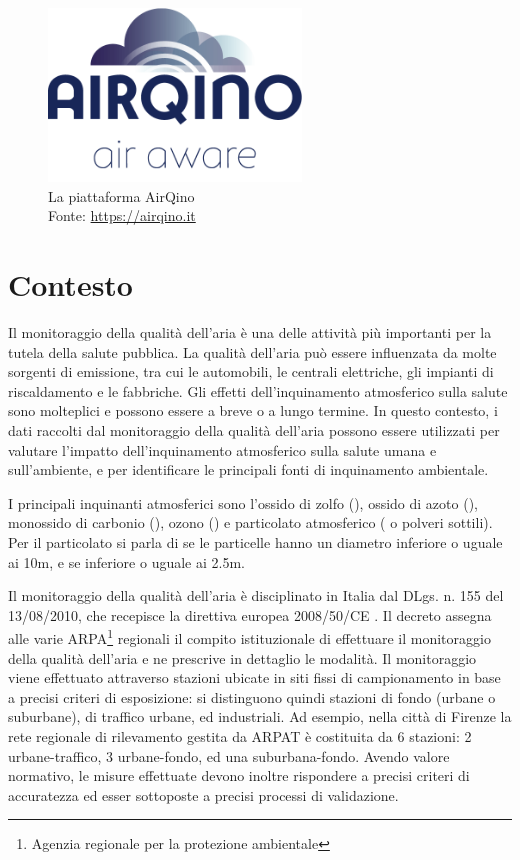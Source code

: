 \vspace{3mm}
\begin{figure}[H]
\centering
\captionsetup{justification=centering}
\includegraphics[width=0.60\textwidth,height=\textheight,keepaspectratio]{img/airqino}
\caption{La piattaforma AirQino\\Fonte: \url{https://airqino.it}}
\label{fig:airqino}
\end{figure}

\section{Contesto}\label{sec:contesto}
Il monitoraggio della qualità dell'aria è una delle attività più importanti per la tutela della salute pubblica. La qualità dell'aria può essere influenzata da molte sorgenti di emissione, tra cui le automobili, le centrali elettriche, gli impianti di riscaldamento e le fabbriche. Gli effetti dell'inquinamento atmosferico sulla salute sono molteplici e possono essere a breve o a lungo termine. In questo contesto, i dati raccolti dal monitoraggio della qualità dell'aria possono essere utilizzati per valutare l'impatto dell'inquinamento atmosferico sulla salute umana e sull'ambiente, e per identificare le principali fonti di inquinamento ambientale.

I principali inquinanti atmosferici sono l'ossido di zolfo (), ossido di azoto (), monossido di carbonio (), ozono () e particolato atmosferico ( o polveri sottili). Per il particolato si parla di  se le particelle hanno un diametro inferiore o uguale ai 10\textmu m, e  se inferiore o uguale ai 2.5\textmu m.

Il monitoraggio della qualità dell’aria è disciplinato in Italia dal DLgs. n. 155 del 13/08/2010, che recepisce la direttiva europea 2008/50/CE \cite{direttiva}. Il decreto assegna alle varie ARPA\footnote{Agenzia regionale per la protezione ambientale} regionali il compito istituzionale di effettuare il monitoraggio della qualità dell’aria e ne prescrive in dettaglio le modalità. Il monitoraggio viene effettuato attraverso stazioni ubicate in siti fissi di campionamento in base a precisi criteri di esposizione: si distinguono quindi stazioni di fondo (urbane o suburbane), di traffico urbane, ed industriali. Ad esempio, nella città di Firenze la rete regionale di rilevamento gestita da ARPAT è costituita da 6 stazioni: 2 urbane-traffico, 3 urbane-fondo, ed una suburbana-fondo. Avendo valore normativo, le misure effettuate devono inoltre rispondere a precisi criteri di accuratezza ed esser sottoposte a precisi processi di validazione. \cite{relazione_alice}

